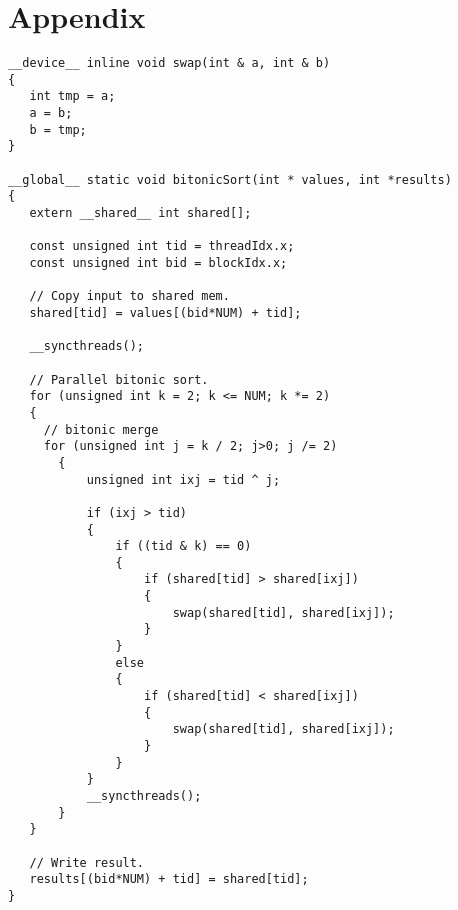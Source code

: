 






 





\section{Appendix}
\begin{codesize}
\begin{verbatim}
__device__ inline void swap(int & a, int & b)
{
   int tmp = a;
   a = b;
   b = tmp;
}

__global__ static void bitonicSort(int * values, int *results)
{
   extern __shared__ int shared[];

   const unsigned int tid = threadIdx.x;
   const unsigned int bid = blockIdx.x;

   // Copy input to shared mem.
   shared[tid] = values[(bid*NUM) + tid];

   __syncthreads();

   // Parallel bitonic sort.
   for (unsigned int k = 2; k <= NUM; k *= 2)
   { 
     // bitonic merge
     for (unsigned int j = k / 2; j>0; j /= 2)
       {
           unsigned int ixj = tid ^ j;

           if (ixj > tid)
           {
               if ((tid & k) == 0)
               {
                   if (shared[tid] > shared[ixj])
                   {
                       swap(shared[tid], shared[ixj]);
                   }
               }
               else
               {
                   if (shared[tid] < shared[ixj])
                   {
                       swap(shared[tid], shared[ixj]);
                   }
               }
           }
           __syncthreads();
       }
   }

   // Write result.
   results[(bid*NUM) + tid] = shared[tid];
}
\end{verbatim}
\end{codesize}





